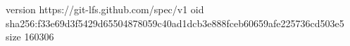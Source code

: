 version https://git-lfs.github.com/spec/v1
oid sha256:f33e69d3f5429d65504878059c40ad1dcb3e888fceb60659afe225736cd503e5
size 160306
